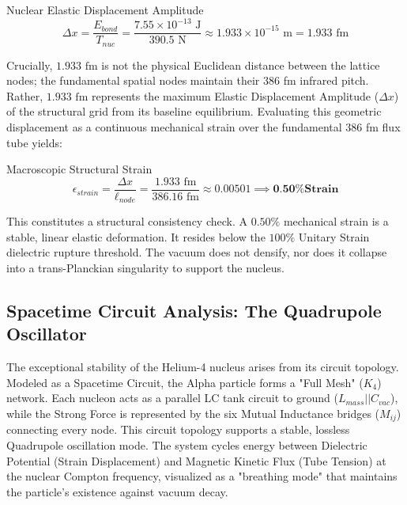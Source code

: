 \begin{resultbox}{Nuclear Elastic Displacement Amplitude}
\begin{equation}
    \Delta x = \frac{E_{bond}}{T_{nuc}} = \frac{7.55 \times 10^{-13}\text{ J}}{390.5\text{ N}} \approx 1.933 \times 10^{-15}\text{ m} = 1.933\text{ fm}
\end{equation}
\end{resultbox}
    
Crucially, $1.933\text{ fm}$ is not the physical Euclidean distance between the lattice nodes; the fundamental spatial nodes maintain their 386 fm infrared pitch. Rather, $1.933\text{ fm}$ represents the maximum Elastic Displacement Amplitude ($\Delta x$) of the structural grid from its baseline equilibrium. Evaluating this geometric displacement as a continuous mechanical strain over the fundamental 386 fm flux tube yields:
    
\begin{resultbox}{Macroscopic Structural Strain}
\begin{equation}
    \epsilon_{strain} = \frac{\Delta x}{\ell_{node}} = \frac{1.933\text{ fm}}{386.16\text{ fm}} \approx 0.00501 \implies \textbf{0.50\% Strain}
\end{equation}
\end{resultbox}

This constitutes a structural consistency check. A $0.50\%$ mechanical strain is a stable, linear elastic deformation. It resides below the $100\%$ Unitary Strain dielectric rupture threshold. The vacuum does not densify, nor does it collapse into a trans-Planckian singularity to support the nucleus.

\subsection{Spacetime Circuit Analysis: The Quadrupole Oscillator}

The exceptional stability of the Helium-4 nucleus arises from its circuit topology. Modeled as a Spacetime Circuit, the Alpha particle forms a "Full Mesh" ($K_{4}$) network. Each nucleon acts as a parallel LC tank circuit to ground ($L_{mass}||C_{vac}$), while the Strong Force is represented by the six Mutual Inductance bridges ($M_{ij}$) connecting every node. This circuit topology supports a stable, lossless Quadrupole oscillation mode. The system cycles energy between Dielectric Potential (Strain Displacement) and Magnetic Kinetic Flux (Tube Tension) at the nuclear Compton frequency, visualized as a "breathing mode" that maintains the particle's existence against vacuum decay.

